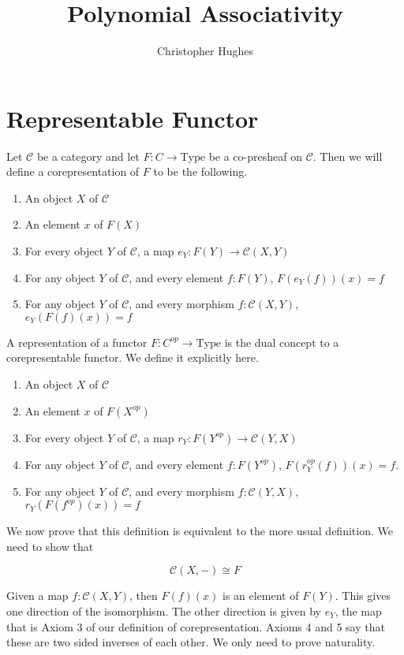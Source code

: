 \documentclass[12pt]{article} %
\title{Polynomial Associativity}
\author{Christopher Hughes}
\theoremstyle{definition}
\theoremstyle{definition}
\theoremstyle{definition}
\theoremstyle{definition}
\begin{document}
\section{Representable Functor}

Let $\mathcal{C}$ be a category and let $F : C \to \text{Type}$
be a co-presheaf on $\mathcal{C}$. Then we will define a corepresentation of
$F$ to be the following.

\begin{enumerate}
  \item An object $X$ of $\mathcal{C}$
  \item An element $x$ of $F(X)$
  \item For every object $Y$ of $\mathcal{C}$, a map $e_Y : F(Y) \to \mathcal{C}(X, Y)$
  \item For any object $Y$ of $\mathcal{C}$, and every element $f : F(Y)$, $F(e_Y(f))(x) = f$
  \item For any object $Y$ of $\mathcal{C}$, and every morphism $f : \mathcal{C}(X, Y)$,
    $e_Y(F(f)(x)) = f$
\end{enumerate}

A representation of a functor $F : C^{op} \to \text{Type}$ is the dual concept to a corepresentable
functor. We define it explicitly here.

\begin{enumerate}
  \item An object $X$ of $\mathcal{C}$
  \item An element $x$ of $F(X^{op})$
  \item For every object $Y$ of $\mathcal{C}$, a map $r_Y : F(Y^{op}) \to \mathcal{C}(Y, X)$
  \item For any object $Y$ of $\mathcal{C}$, and every element $f : F(Y^{op})$, $F(r_Y^{op}(f))(x) = f$.
  \item For any object $Y$ of $\mathcal{C}$, and every morphism $f : \mathcal{C}(Y, X)$,
  $r_Y(F(f^{op})(x)) = f$
\end{enumerate}

We now prove that this definition is equivalent to the more usual definition. We need to show that


\begin{equation}
\mathcal{C}(X, -) \cong F
\end{equation}

Given a map $f : \mathcal{C}(X, Y)$, then $F(f)(x)$ is an element of $F(Y)$. This gives one 
direction of the isomorphism. The other direction is given by $e_Y$, the map that is
Axiom 3 of our definition of corepresentation. Axioms 4 and 5 say that these are two sided inverses
of each other. We only need to prove naturality.
\end{document}
